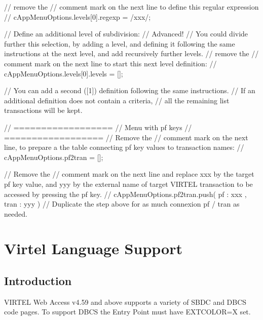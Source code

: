 \documentclass[letterpaper,10pt,english]{sphinxmanual}
\begin{document}
\begin{sphinxVerbatim}[commandchars=\\\{\}]
// remove the // comment mark on the next line to define this regular expression
// cAppMenuOptions.levels[0].regexp = /xxx/;

// \PYGZhy{} Define an additional level of subdivision:
// Advanced!
// You could divide further this selection, by adding a level, and defining it following the same instructions at the next level, and add recursively further levels.
// remove the // comment mark on the next line to start this next level definition:
// cAppMenuOptions.levels[0].levels = [];



// You can add a second ([1]) definition following the same instructions.
// If an additional definition does not contain a criteria,
// all the remaining list transactions will be kept.



// ==================
// Menu with pf keys
// ==================
// Remove the // comment mark on the next line, to prepare a the table connecting pf key values to transaction names:
// cAppMenuOptions.pf2tran = [];

// Remove the // comment mark on the next line and replace \PYGZdq{}xxx\PYGZdq{} by the target pf key value, and \PYGZdq{}yyy\PYGZdq{} by the external name of target VIRTEL transaction to be accessed by pressing the pf key.
// cAppMenuOptions.pf2tran.push(\PYGZob{} \PYGZdq{}pf\PYGZdq{}  : \PYGZdq{}xxx\PYGZdq{} , \PYGZdq{}tran\PYGZdq{} : \PYGZdq{}yyy\PYGZdq{} \PYGZcb{})
// Duplicate the step above for as much connexion pf / tran as needed.
\end{sphinxVerbatim}

\ignorespaces 

\chapter{Virtel Language Support}
\label{\detokenize{Customization:virtel-language-support}}\label{\detokenize{Customization:index-125}}

\section{Introduction}
\label{\detokenize{Customization:id1}}
\sphinxAtStartPar
VIRTEL Web Access v4.59 and above supports a variety of SBDC and DBCS code pages. To support DBCS the Entry Point must have EXTCOLOR=X set.
\end{document}
